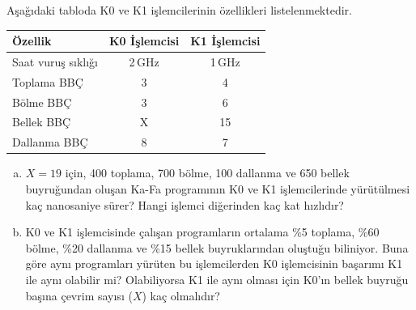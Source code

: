 \begin{alistirma}[\zor]
Aşağıdaki tabloda K0 ve K1 işlemcilerinin özellikleri listelenmektedir.

\begin{center}
\begin{tabular}{lcc}
\toprule
\textbf{Özellik} & \textbf{K0 İşlemcisi} & \textbf{K1 İşlemcisi} \\
\midrule
Saat vuruş sıklığı & 2\,GHz & 1\,GHz \\
Toplama BBÇ & 3 & 4 \\
Bölme BBÇ & 3 & 6 \\
Bellek BBÇ & X & 15 \\
Dallanma BBÇ & 8 & 7 \\
\bottomrule
\end{tabular}
\end{center}

\begin{enumerate}[(a)]
    \item $X=19$ için, 400 toplama, 700 bölme, 100 dallanma ve 650 bellek buyruğundan oluşan Ka-Fa programının K0 ve K1 işlemcilerinde yürütülmesi kaç nanosaniye sürer? Hangi işlemci diğerinden kaç kat hızlıdır?
    \item K0 ve K1 işlemcisinde çalışan programların ortalama \%5 toplama, \%60 bölme, \%20 dallanma ve \%15 bellek buyruklarından oluştuğu biliniyor. Buna göre aynı programları yürüten bu işlemcilerden K0 işlemcisinin başarımı K1 ile aynı olabilir mi? Olabiliyorsa K1 ile aynı olması için K0'ın bellek buyruğu başına çevrim sayısı ($X$) kaç olmalıdır?
\end{enumerate}
\end{alistirma}


